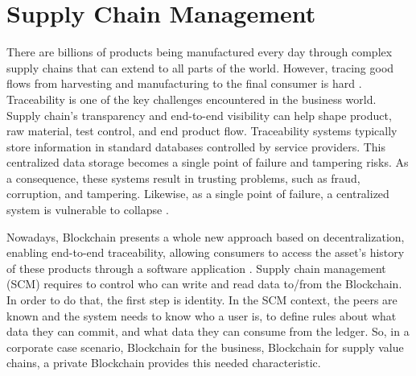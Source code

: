 \section{Supply Chain Management} \label{sec:General}

There are billions of products being manufactured every day through complex supply chains that can extend to all parts of the world. However, tracing good flows from harvesting and manufacturing to the final consumer is hard \cite{galvez2018future}. Traceability is one of the key challenges encountered in the business world. Supply chain's transparency and end-to-end visibility can help shape product, raw material, test control, and end product flow\cite{tian2017supply}. Traceability systems typically store information in standard databases controlled by service providers. This centralized data storage becomes a single point of failure and tampering risks. As a consequence, these systems result in trusting problems, such as fraud, corruption, and tampering. Likewise, as a single point of failure, a centralized system is vulnerable to collapse \cite{tian2017supply}.

Nowadays, Blockchain presents a whole new approach based on decentralization, enabling end-to-end traceability, allowing consumers to access the asset's history of these products through a software application \cite{galvez2018future}. Supply chain management (SCM) requires to control who can write and read data to/from the Blockchain. In order to do that, the first step is identity. In the SCM context, the peers are known and the system needs to know who a user is, to define rules about what data they can commit, and what data they can consume from the ledger. So, in a corporate case scenario, Blockchain for the business, Blockchain for supply value chains, a private Blockchain provides this needed characteristic.
